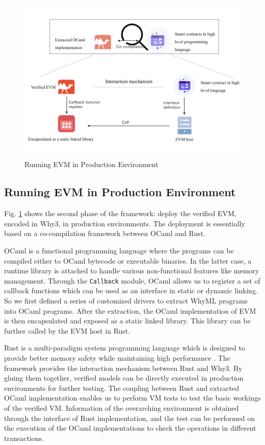 \documentclass[runningheads]{llncs}
\begin{document}
\begin{figure}[t]
  \centering
  \includegraphics[scale=0.4]{runninginPE.pdf}
  \caption{Running EVM in Production Environment}
   \label{fig2}
\end{figure}

\subsection{Running EVM in Production Environment}
Fig. \ref{fig2} shows the second phase of the framework: deploy the verified EVM, encoded in Why3, in production environments. The deployment is essentially based on a co-compilation framework between OCaml and Rust.

OCaml is a functional programming language where the programs can be compiled either to OCaml bytecode or executable binaries. In the latter case, a runtime library is attached to handle various non-functional features like memory management. Through the \texttt{Callback} module, OCaml allows us to register a set of callback functions which can be used as an interface in static or dynamic linking. 
So we first defined a series of customized drivers to extract WhyML programs into OCaml programs. After the extraction, the OCaml implementation of EVM is then encapsulated and exposed as a static linked library. This library can be further called by the EVM host in Rust.

Rust is a multi-paradigm system programming language which is designed to provide better memory safety while maintaining high performance \cite{LBHN16}.
The framework provides the interaction mechanism between Rust and Why3. By gluing them together, verified models can be directly executed in production environments for further testing. The coupling between Rust and extracted OCaml implementation enables us to perform VM tests to test the basic workings of the verified VM. Information of the overarching environment is obtained through the interface of Rust implementation, and the test can be performed on the execution of the OCaml implementations to check the operations in different transactions.    
\end{document}
